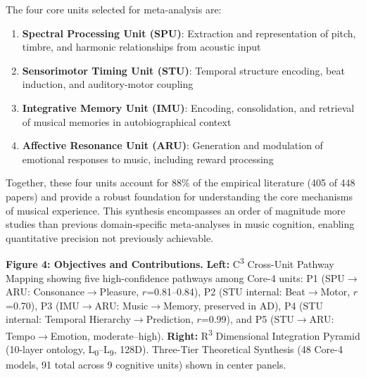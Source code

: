 \documentclass[9pt,onecolumn]{article}
\newcommand{\STU}{\textcolor{stucolor}{\textbf{STU}}}
\newcommand{\IMU}{\textcolor{imucolor}{\textbf{IMU}}}
\newcommand{\SPU}{\textcolor{spucolor}{\textbf{SPU}}}
\newcommand{\ARU}{\textcolor{arucolor}{\textbf{ARU}}}
\begin{document}
The four core units selected for meta-analysis are:

\begin{enumerate}[leftmargin=*, topsep=0pt, itemsep=0pt]
    \item \textbf{Spectral Processing Unit (\SPU{})}: Extraction and representation of pitch, timbre, and harmonic relationships from acoustic input
    \item \textbf{Sensorimotor Timing Unit (\STU{})}: Temporal structure encoding, beat induction, and auditory-motor coupling
    \item \textbf{Integrative Memory Unit (\IMU{})}: Encoding, consolidation, and retrieval of musical memories in autobiographical context
    \item \textbf{Affective Resonance Unit (\ARU{})}: Generation and modulation of emotional responses to music, including reward processing
\end{enumerate}

Together, these four units account for 88\% of the empirical literature (405 of 448 papers) and provide a robust foundation for understanding the core mechanisms of musical experience. This synthesis encompasses an order of magnitude more studies than previous domain-specific meta-analyses in music cognition, enabling quantitative precision not previously achievable.




\onecolumn
\noindent

\vspace{0.15em}
\noindent
{\fontsize{6.5}{7.8}\selectfont\textbf{Figure 4: Objectives and Contributions.} \textbf{Left:} C\textsuperscript{3} Cross-Unit Pathway Mapping showing five high-confidence pathways among Core-4 units: P1 (SPU$\to$ARU: Consonance$\to$Pleasure, $r$=0.81--0.84), P2 (STU internal: Beat$\to$Motor, $r$=0.70), P3 (IMU$\to$ARU: Music$\to$Memory, preserved in AD), P4 (STU internal: Temporal Hierarchy$\to$Prediction, $r$=0.99), and P5 (STU$\to$ARU: Tempo$\to$Emotion, moderate--high). \textbf{Right:} R\textsuperscript{3} Dimensional Integration Pyramid (10-layer ontology, L\textsubscript{0}--L\textsubscript{9}, 128D). Three-Tier Theoretical Synthesis (48 Core-4 models, 91 total across 9 cognitive units) shown in center panels.}
\label{fig:objectives-contributions}
\end{document}
